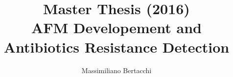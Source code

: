 \documentclass[11pt, a4paper]{article}
\begin{document}
\vspace{150pt}
\title{\normalsize\bfseries Master Thesis (2016)\\
\vspace{20pt}
\Large\bfseries AFM Developement and Antibiotics Resistance Detection
%
%
%
%
%
%
}

\author{Massimiliano Bertacchi}
%
%
%
\maketitle %
\end{document}
